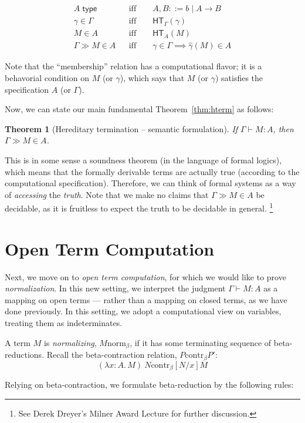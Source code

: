 \documentclass{article}
\newtheorem{thm}{Theorem}
\newcommand{\hasEF}[3]{\ensuremath{#1 \vdash #2 : #3}}
\newcommand{\hasEC}[3]{\ensuremath{#1 \gg #2 \in #3}}
\newcommand{\hterm}[2]{\ensuremath{\mathsf{HT}_{#1}(#2)}}
\newcommand{\contrb}[2]{#1 \mathrel{\text{contr}_\beta} #2}
\newcommand{\bnorm}[1]{\ensuremath{#1 \mathrel{\text{norm}_\beta}}}
\newcommand{\fn}[2]{\ensuremath{#1 \to #2}}
\newcommand{\ap}[2]{\ensuremath{#1\ #2}}
\newcommand{\lam}[3]{\ensuremath{\lambda #1 {:} #2.\, #3}}
\begin{document}
\begin{align*}
&A \; \mathsf{type} &&\text{iff}  \quad \quad A, B ::= b \mid \fn{A}{B}&\\
&\gamma \in \Gamma &&\text{iff} \quad \quad \hterm{\Gamma}{\gamma}&\\
&M \in A &&\text{iff} \quad \quad \hterm{A}{M}&\\
&\hasEC{\Gamma}{M}{A} &&\text{iff} \quad \quad \gamma \in \Gamma \implies \hat\gamma(M) \in A&
\end{align*}

Note that the ``membership'' relation has a computational flavor; it is a behavorial condition
on $M$ (or $\gamma$), which says that $M$ (or $\gamma$) satisfies the specification $A$ (or
$\Gamma$).

Now, we can state our main fundamental Theorem~\ref{thm:hterm} as follows:

\begin{thm}[Hereditary termination -- semantic formulation]
If $\hasEF{\Gamma}{M}{A}$, then $\hasEC{\Gamma}{M}{A}$.
\end{thm}

This is in some sense a soundness theorem (in the language of formal logics), which means that
the formally derivable terms are actually true (according to the computational
specification). Therefore, we can think of formal systems as a way of \emph{accessing} the
\emph{truth}. Note that we make no claims that $\hasEC{\Gamma}{M}{A}$ be decidable, as it is
fruitless to expect the truth to be decidable in general. \footnote{See Derek Dreyer's Milner
  Award Lecture for further discussion.}

\section{Open Term Computation}

Next, we move on to \emph{open term computation}, for which we would like to prove
\emph{normalization}.  In this new setting, we interpret the judgment $\hasEF{\Gamma}{M}{A}$ as
a mapping on open terms --- rather than a mapping on closed terms, as we have done previously.
In this setting, we adopt a computational view on variables, treating them as indeterminates.

A term $M$ is \emph{normalizing}, $\bnorm{M}$, if it has some terminating sequence of
beta-reductions.  Recall the beta-contraction relation, $\contrb{P}{P'}$:
\[
\contrb{\ap{(\lam{x}{A}{M})}{N}}{[N/x]M}
\]

Relying on beta-contraction, we formulate beta-reduction by the following rules:
\end{document}
